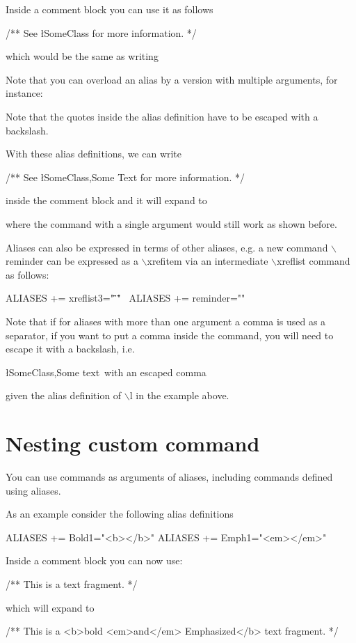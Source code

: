 Inside a comment block you can use it as follows \begin{DoxyVerb}
/** See \l{SomeClass} for more information. */
\end{DoxyVerb}
 which would be the same as writing 


Note that you can overload an alias by a version with multiple arguments, for instance: 
 Note that the quotes inside the alias definition have to be escaped with a backslash.

With these alias definitions, we can write \begin{DoxyVerb}
/** See \l{SomeClass,Some Text} for more information. */
\end{DoxyVerb}
 inside the comment block and it will expand to 
 where the command with a single argument would still work as shown before.

Aliases can also be expressed in terms of other aliases, e.g. a new command $\backslash$reminder can be expressed as a $\backslash$xrefitem via an intermediate $\backslash$xreflist command as follows: \begin{DoxyVerb}
ALIASES += xreflist{3}="\xrefitem \1 \"\2\" \"\3\" " \
ALIASES += reminder="" \
\end{DoxyVerb}


Note that if for aliases with more than one argument a comma is used as a separator, if you want to put a comma inside the command, you will need to escape it with a backslash, i.e. \begin{DoxyVerb}
\l{SomeClass,Some text\, with an escaped comma} 
\end{DoxyVerb}
 given the alias definition of $\backslash$l in the example above.\hypertarget{custcmd_custcmd_nesting}{}\section{Nesting custom command}\label{custcmd_custcmd_nesting}
You can use commands as arguments of aliases, including commands defined using aliases.

As an example consider the following alias definitions

\begin{DoxyVerb}
ALIASES += Bold{1}="<b>\1</b>"
ALIASES += Emph{1}="<em>\1</em>"
\end{DoxyVerb}


Inside a comment block you can now use: \begin{DoxyVerb}
/** This is a  text fragment. */
\end{DoxyVerb}
 which will expand to \begin{DoxyVerb}
/** This is a <b>bold <em>and</em> Emphasized</b> text fragment. */
\end{DoxyVerb}
 
